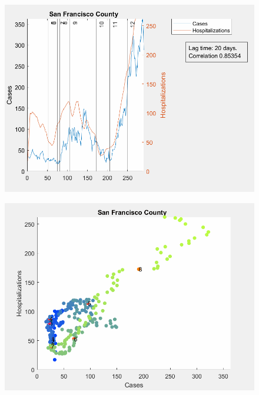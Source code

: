 \documentclass[12pt]{article}
\begin{document}
\begin{figure}[!h]
	\includegraphics[width=\linewidth]{images/san_francisco_cases_hospitalizations_line-20lag.png}
	\caption{}
	\label{fig:images/san_francisco_cases_hospitalizations_line-20lagLabel}
\end{figure}

\begin{figure}[!h]
	\includegraphics[width=\linewidth]{images/san_francisco_cases_hospitalizations_scatter-20lag.png}
	\caption{}
	\label{fig:images/san_francisco_cases_hospitalizations_scatter-20lagLabel}
\end{figure}
\end{document}
